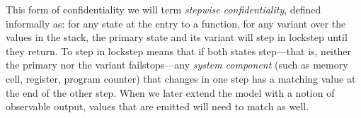 \documentclass[acmsmall,review,anonymous]{acmart}\settopmatter{printfolios=true,printccs=false,printacmref=false}
\begin{document}
This form of confidentiality we will term {\em stepwise confidentiality}, defined informally
as: for any state at the entry to a function, for any variant over the values in the stack,
the primary state and its variant will step in lockstep until they return. To step in lockstep
means that if both states step---that is, neither the primary nor the variant failstops---any
{\em system component} (such as memory cell, register, program counter) that changes
in one step has a matching value at the end of the other step. When we later
extend the model with a notion of observable output, values that are emitted will need
to match as well.

\end{document}
